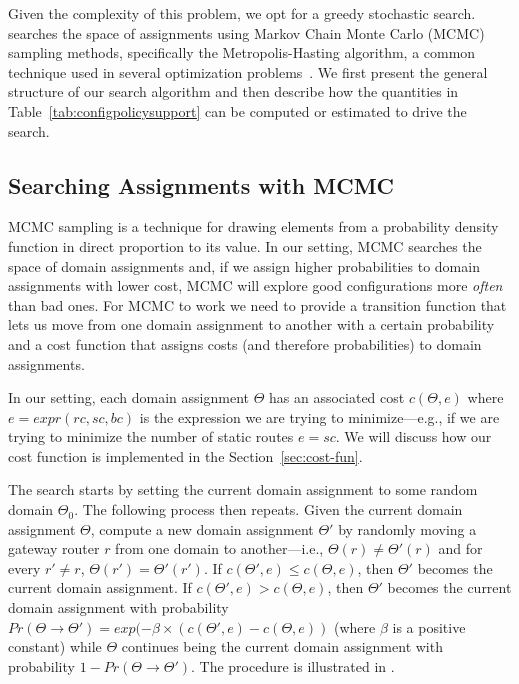 Given the complexity of this problem, we opt for a greedy
stochastic search.
\name searches the space of assignments using Markov
Chain Monte Carlo (MCMC) sampling methods, specifically the Metropolis-Hasting
algorithm, a common technique used in several optimization 
problems~\cite{stoke}. 
We first present the general structure of our search 
algorithm and 
then describe how the quantities 
in Table~\ref{tab:configpolicysupport} can be computed
or estimated to drive the search.



\subsection{Searching Assignments with MCMC}
MCMC sampling is a technique for 
drawing elements from a
probability density function in direct proportion to its value.
In our setting, MCMC searches the space of domain assignments and,
if we assign higher probabilities to domain assignments with lower cost, MCMC will explore
good configurations more \emph{often} than bad ones.
For MCMC to work we need to provide a transition function that lets us move from one domain assignment
to another with a certain probability and a cost function that assigns costs (and therefore probabilities) to
domain assignments. 

In our setting, each domain assignment $\Theta$
has an associated cost $c(\Theta, e)$
where
$e=expr(rc, sc, bc)$
is the expression we are trying to minimize---e.g., if we are trying to minimize the number of static routes $e=sc$.
We will discuss how our cost function is implemented in the Section~\ref{sec:cost-fun}.

The search starts by setting the current domain assignment 
to some random domain $\Theta_0$.
The following process then repeats.
Given the current domain
assignment $\Theta$, 
compute a new domain assignment $\Theta'$ by randomly
moving a gateway 
router $r$ from one domain to another---i.e., $\Theta(r){\neq}\Theta'(r)$ and
for every $r'{\neq} r$, $\Theta(r'){=}\Theta'(r')$.
If $c(\Theta',e)\leq c(\Theta,e)$, then $\Theta'$ becomes the current domain assignment.
If $c(\Theta',e)>c(\Theta,e)$, then $\Theta'$ becomes the current domain assignment
with probability $Pr(\Theta \rightarrow \Theta')= exp(-\beta\times(c(\Theta',e) - c(\Theta,e))$ (where $\beta$ is a positive constant) 
while 
 $\Theta$ continues being the current domain assignment with probability $1-Pr(\Theta \rightarrow \Theta')$.
\iffull
The procedure is illustrated in .
\fi


